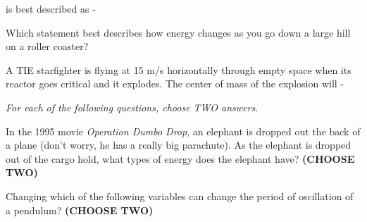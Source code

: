 \documentclass[10pt]{examdesign}
\begin{document}
\begin{multiplechoice} [title={Multiple Choice (5 Points Each)},
	rearrange=no]
\begin{question}
	 is best described as - 
\end{question}

\begin{question}
	Which statement best describes how energy changes as you go down a large hill on a roller coaster?
\end{question}

\begin{question}
	A TIE starfighter is flying at 15 m/s horizontally through empty space when its reactor goes critical and it explodes.  The center of mass of the explosion will - 
\end{question}


	\end{multiplechoice}

\begin{multiplechoice} [title={Multiple Correct Multiple Choice},
	rearrange=yes]
 	\textit{For each of the following questions, choose TWO answers.  }
	\begin{question}
	In the 1995 movie \textit{Operation Dumbo Drop}, an elephant is dropped out the back of a plane (don't worry, he has a really big parachute).    As the elephant is dropped out of the cargo hold, what types of energy does the elephant have? \textbf{(CHOOSE TWO)}
	\end{question}

\begin{question}
Changing which of the following variables can change the period of oscillation of a pendulum? \textbf{(CHOOSE TWO)}
\end{question}





\end{multiplechoice}
\end{document}
